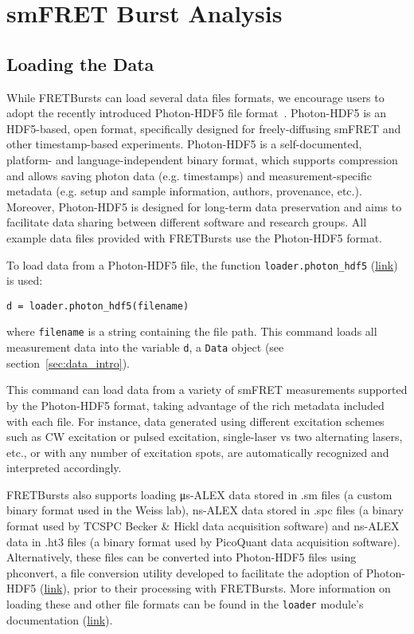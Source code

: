 \section{smFRET Burst Analysis}
\label{sec:analysis}

\subsection{Loading the Data}
\label{sec:dataload}
While FRETBursts can load several data files formats,
we encourage users to adopt the recently introduced Photon-HDF5 file format~\cite{Ingargiola2016}.
Photon-HDF5 is an HDF5-based, open format, specifically designed for freely-diffusing smFRET and other timestamp-based experiments.
Photon-HDF5 is a self-documented, platform- and language-independent binary format,
which supports compression and allows saving photon data (e.g. timestamps) and measurement-specific metadata
(e.g. setup and sample information, authors, provenance, etc.).
Moreover, Photon-HDF5 is designed for long-term data preservation and aims to facilitate data sharing
between different software and research groups.
All example data files provided with FRETBursts use the Photon-HDF5 format.

To load data from a Photon-HDF5 file, the function \verb|loader.photon_hdf5|
(\href{http://fretbursts.readthedocs.org/en/latest/loader.html#fretbursts.loader.photon_hdf5}{link})
is used:

\begin{lstlisting}
d = loader.photon_hdf5(filename)
\end{lstlisting}

\noindent
where \verb|filename| is a string containing the file path.
This command loads all measurement data into the variable \verb|d|, 
a \verb|Data| object (see section~\ref{sec:data_intro}).

This command can load data from a variety of smFRET measurements supported
by the Photon-HDF5 format, taking advantage of the rich metadata included with each file.
For instance, data generated using different excitation schemes such as CW excitation or pulsed excitation, single-laser vs two alternating lasers, etc., or with any number of excitation spots, are automatically recognized and interpreted accordingly.

FRETBursts also supports loading μs-ALEX data stored in .sm files
(a custom binary format used in the Weiss lab),
ns-ALEX data stored in .spc files (a binary format used by TCSPC Becker \& Hickl data acquisition software) and
ns-ALEX data in .ht3 files (a binary format used by PicoQuant data acquisition software).
Alternatively, these files can be converted into Photon-HDF5 files using phconvert, a file conversion utility developed to facilitate the adoption of Photon-HDF5 (\href{http://photon-hdf5.github.io/phconvert/}{link}), prior to their processing with FRETBursts.
More information on loading these and other file formats 
can be found in the \verb|loader| module's documentation
(\href{http://fretbursts.readthedocs.org/en/latest/loader.html}{link}).


